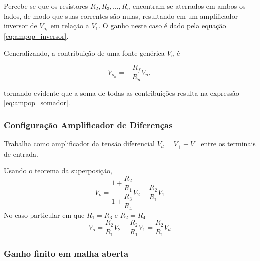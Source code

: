 \documentclass{article}
\numberwithin{equation}{section}
\begin{document}
Percebe-se que os resistores $R_2, R_3, \dots, R_n$ encontram-se aterrados em ambos os lados, de modo que suas correntes são nulas, resultando em um amplificador inversor de $V_{o_1}$ em relação a $V_1$. O ganho neste caso é dado pela equação \eqref{eq:ampop_inversor}.

Generalizando, a contribuição de uma fonte genérica $V_n$ é

\begin{equation}
    V_{o_n} = - \dfrac{R_f}{R_n}V_n,
\end{equation}

\noindent tornando evidente que a soma de todas as contribuições resulta na expressão \eqref{eq:ampop_somador}.

\subsubsection{Configuração Amplificador de Diferenças}
Trabalha como amplificador da tensão diferencial $V_{d}=V_{+}-V_{-}$ entre os terminais de entrada.

\begin{center}
\end{center}

Usando o teorema da superposição,
\begin{equation*}
    V_{o}=\frac{1+\dfrac{R_{2}}{R_{1}}}{1+\dfrac{R_{3}}{R_{4}}}V_{2} - \dfrac{R_{2}}{R_{1}}V_{1}
\end{equation*}
No caso particular em que $R_{1}=R_{3}$ e $R_{2}=R_{4}$
\begin{equation}
    V_{o}=\frac{R_{2}}{R_{1}}V_{2}-\frac{R_{2}}{R_{1}}V_{1}=\frac{R_{2}}{R_{1}}V_{d}
\end{equation}

\subsubsection{Ganho finito em malha aberta}
\label{subsubsec:ganho finito}
\end{document}
